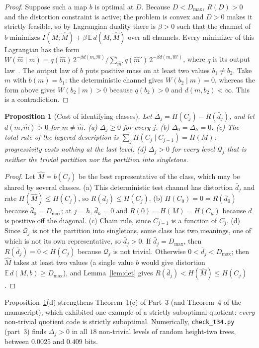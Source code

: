 \documentclass[11pt]{article}
\newtheorem{proposition}[theorem]{Proposition}
\theoremstyle{definition}
\theoremstyle{remark}
\newcommand{\Q}{\mathcal{Q}}
\newcommand{\E}{\mathbb{E}}
\begin{document}
\begin{proof}
Suppose such a map $b$ is optimal at $D$. Because $D<D_{\max}$, $R(D)>0$ and the distortion constraint is active; the problem is convex and $D>0$ makes it strictly feasible, so by Lagrangian duality there is $\beta>0$ such that the channel of $b$ minimizes $I(M;\hat M)+\beta\,\E\,d(M,\hat M)$ over all channels. Every minimizer of this Lagrangian has the form $W(\hat m\mid m)=q(\hat m)\,2^{-\beta d(m,\hat m)}/\sum_{\hat m'}q(\hat m')\,2^{-\beta d(m,\hat m')}$, where $q$ is its output law~\cite[Ch.~10]{cover2006}. The output law of $b$ puts positive mass on at least two values $b_1\neq b_2$. Take $m$ with $b(m)=b_1$: the deterministic channel gives $W(b_2\mid m)=0$, whereas the form above gives $W(b_2\mid m)>0$ because $q(b_2)>0$ and $d(m,b_2)<\infty$. This is a contradiction.
\end{proof}

\begin{proposition}[Cost of identifying classes]\label{prop:cost}
Let $\Delta_j=H(C_j)-R(\bar d_j)$, and let $d(m,\hat m)>0$ for $m\neq\hat m$.
(a) $\Delta_j\ge0$ for every $j$.
(b) $\Delta_0=\Delta_h=0$.
(c) The total rate of the layered description is $\sum_jH(C_j\mid C_{j-1})=H(M)$: progressivity costs nothing at the last level.
(d) $\Delta_j>0$ for every level $\Q_j$ that is neither the trivial partition nor the partition into singletons.
\end{proposition}

\begin{proof}
Let $\hat M=b(C_j)$ be the best representative of the class, which may be shared by several classes. (a) This deterministic test channel has distortion $\bar d_j$ and rate $H(\hat M)\le H(C_j)$, so $R(\bar d_j)\le H(C_j)$. (b) $H(C_0)=0=R(\bar d_0)$ because $\bar d_0=D_{\max}$; at $j=h$, $\bar d_h=0$ and $R(0)=H(M)=H(C_h)$ because $d$ is positive off the diagonal. (c) Chain rule, since $C_{j-1}$ is a function of $C_j$. (d) Since $\Q_j$ is not the partition into singletons, some class has two meanings, one of which is not its own representative, so $\bar d_j>0$. If $\bar d_j=D_{\max}$, then $R(\bar d_j)=0<H(C_j)$ because $\Q_j$ is not trivial. Otherwise $0<\bar d_j<D_{\max}$; then $\hat M$ takes at least two values (a single value $b$ would give distortion $\E\,d(M,b)\ge D_{\max}$), and Lemma~\ref{lem:det} gives $R(\bar d_j)<H(\hat M)\le H(C_j)$.
\end{proof}

Proposition~\ref{prop:cost}(d) strengthens Theorem~1(c) of Part~3 (and Theorem~4 of the manuscript), which exhibited one example of a strictly suboptimal quotient: \emph{every} non-trivial quotient code is strictly suboptimal. Numerically, \texttt{check\_t34.py} (part~3) finds $\Delta_j>0$ in all $18$ non-trivial levels of random height-two trees, between $0.0025$ and $0.409$ bits.
\end{document}
